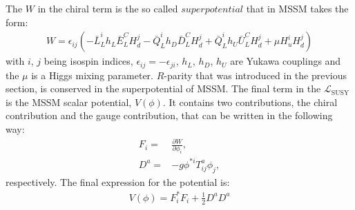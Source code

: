 The $W$ in the chiral term is the so called $superpotential$ that in MSSM takes the form:
\begin{align} 
W=\epsilon_{ij}(-\bar{L}_{L}^{i}h_{L}\bar{E}_{L}^{C}H_{d}^{j}-\bar{Q}_{L}^{i}h_{D}\bar{D}_{L}^{C}H_{d}^{j}+\bar{Q}_{L}^{i}h_{U}\bar{U}_{L}^{C}H_{d}^{j}+\mu H_{u}^{i}H_{d}^{j})
\end{align}
with $i$, $j$ being isospin indices, $\epsilon_{ij}=-\epsilon_{ji}$, $h_{L}$, $h_{D}$, $h_{U}$ are Yukawa couplings and the $\mu$ is a Higgs mixing parameter.
$R$-parity that was introduced in the previous section, is conserved in the superpotential of MSSM. 
The final term in the $\mathcal{L}_{\mathrm{SUSY}}$ is the MSSM scalar potential, $V(\phi)$. 
It contains two contributions, the chiral contribution and the gauge contribution, that can be written in the following way:
\begin{align}
F_{i}=&\frac{\partial W}{\partial \phi_{i}},\\
D^{a}=&-g\phi^{*i}T_{ij}^{a}\phi_{j},
\end{align}
respectively. The final expression for the potential is:
\begin{align}
V(\phi)=F_{i}^{*}F_{i}+\frac{1}{2}D^{a}D^{a}
\end{align}
  

